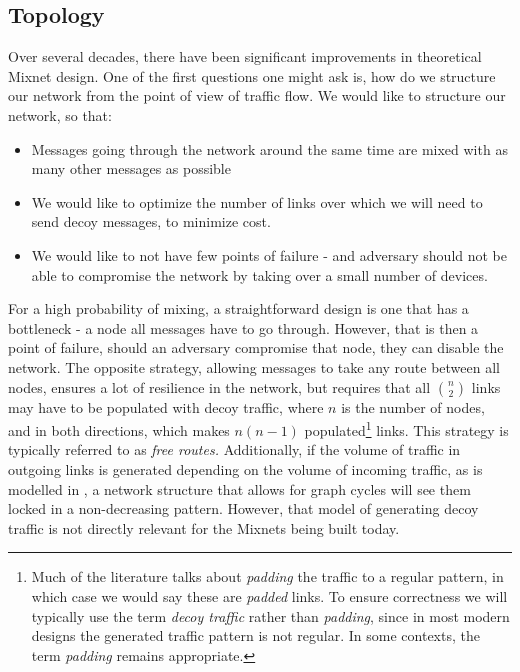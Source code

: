 \documentclass{article}
\begin{document}
\subsection{Topology}
Over several decades, there have been significant improvements in theoretical Mixnet design. One of the first questions one might ask is, how do we structure our network from the point of view of traffic flow. We would like to structure our network, so that:
\begin{itemize}
\item Messages going through the network around the same time are mixed with as many other messages as possible
\item We would like to optimize the number of links over which we will need to send decoy messages, to minimize cost.
\item We would like to not have few points of failure - and adversary should not be able to compromise the network by taking over a small number of devices.
\end{itemize}
For a high probability of mixing, a straightforward design is one that has a bottleneck - a node all messages have to go through. However, that is then a point of failure,  should an adversary compromise that node, they can disable the network. The opposite strategy, allowing messages to take any route between all nodes, ensures a lot of resilience in the network, but requires that all $\binom{n}{2}$ links may have to be populated with decoy traffic, where $n$ is the number of nodes, and in both directions, which makes $n(n-1)$ populated\footnote{Much of the literature talks about \textit{padding} the traffic to a regular pattern, in which case we would say these are \textit{padded} links. To ensure correctness we will typically use the term \textit{decoy traffic} rather than \textit{padding}, since in most modern designs the generated traffic pattern is not regular. In some contexts, the term \textit{padding} remains appropriate.} links. This strategy is typically referred to as \textit{free routes.} Additionally, if the volume of traffic in outgoing links is generated depending on the volume of incoming traffic, as is modelled in , a network structure that allows for graph cycles will see them locked in a non-decreasing pattern. However, that model of generating decoy traffic is not directly relevant for the Mixnets being built today.\medskip
\end{document}
